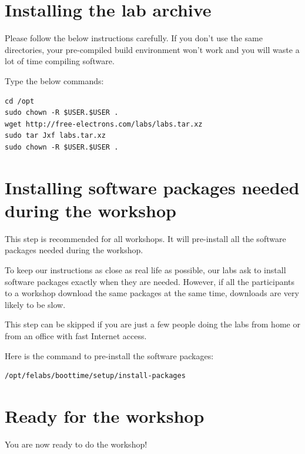 \section{Installing the lab archive}

Please follow the below instructions carefully. If you don't use the
same directories, your pre-compiled build environment won't work and 
you will waste a lot of time compiling software.

Type the below commands:
\begin{verbatim}
cd /opt
sudo chown -R $USER.$USER .
wget http://free-electrons.com/labs/labs.tar.xz
sudo tar Jxf labs.tar.xz
sudo chown -R $USER.$USER .
\end{verbatim}

\section{Installing software packages needed during the workshop}

This step is recommended for all workshops. It will pre-install all the
software packages needed during the workshop.

To keep our instructions as close as real life as possible, our labs
ask to install software packages exactly when they are needed. However,
if all the participants to a workshop download the same packages at the
same time, downloads are very likely to be slow.

This step can be skipped if you are just a few people doing the labs
from home or from an office with fast Internet access.

Here is the command to pre-install the software packages:

\begin{verbatim}
/opt/felabs/boottime/setup/install-packages
\end{verbatim}

\section{Ready for the workshop}

You are now ready to do the workshop!
